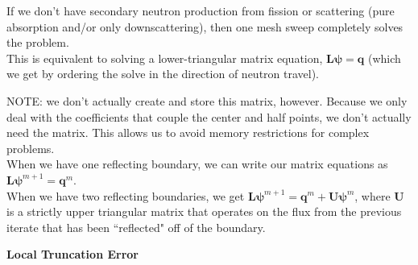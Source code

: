\documentclass[12pt]{article}
\begin{document}
If we don't have secondary neutron production from fission or scattering (pure absorption and/or only downscattering), then one mesh sweep completely solves the problem. \\
This is equivalent to solving a lower-triangular matrix equation, $\mathbf{L}\mathbf{\psi} = \mathbf{q}$ (which we get by ordering the solve in the direction of neutron travel).

NOTE: we don't actually create and store this matrix, however. Because we only deal with the coefficients that couple the center and half points, we don't actually need the matrix.   This allows us to avoid memory restrictions for complex problems. \\
When we have one reflecting boundary, we can write our matrix equations as $\mathbf{L}\mathbf{\psi}^{m+1} = \mathbf{q}^m$.\\
When we have two reflecting boundaries, we get $\mathbf{L}\mathbf{\psi}^{m+1} = \mathbf{q}^m + \mathbf{U}\mathbf{\psi}^{m}$, where $\mathbf{U}$ is a strictly upper triangular matrix that operates on the flux from the previous iterate that has been ``reflected" off of the boundary.

\textbf{Local Truncation Error}\\
\end{document}

